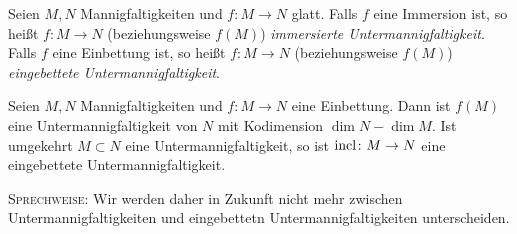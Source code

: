 \begin{definition}
  Seien $M,N$ Mannigfaltigkeiten und $f\colon M \to N$ glatt. Falls
  $f$ eine Immersion ist, so heißt $f\colon M\to N$ (beziehungsweise
  $f(M)$) \emph{immersierte Untermannigfaltigkeit}. Falls $f$ eine
  Einbettung ist, so heißt $f\colon M \to N$ (beziehungsweise $f(M)$)
  \emph{eingebettete Untermannigfaltigkeit}.
\end{definition}

\begin{proposition}
  Seien $M,N$ Mannigfaltigkeiten und $f\colon M\to N$ eine Einbettung. Dann ist
  $f(M)$ eine Untermannigfaltigkeit von $N$ mit Kodimension $\dim N -
  \dim M$. Ist umgekehrt $M\subset N$ eine Untermannigfaltigkeit, so
  ist $\operatorname{incl}\colon M \to N$ eine eingebettete Untermannigfaltigkeit.

  \textsc{Sprechweise:} Wir werden daher in Zukunft nicht mehr
  zwischen Untermannigfaltigkeiten und eingebettetn
  Untermannigfaltigkeiten unterscheiden.
\end{proposition}

